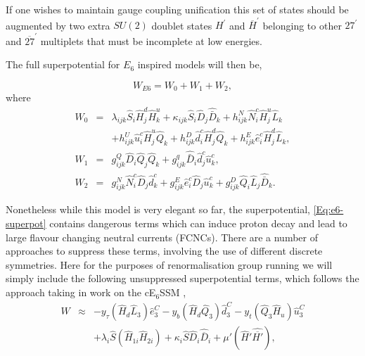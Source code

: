 \documentclass[preprint,amsmath,amssymb,aps,superscriptaddress,prd,showpacs,floatfix]{revtex4-1}
\newcommand{\be}{\begin{equation}}
\newcommand{\ee}{\end{equation}}
\newcommand{\ba}{\begin{eqnarray}}
\newcommand{\ea}{\end{eqnarray}}
\newcommand{\SuperField}[1]{\hat{#1}}
\begin{document}
If one wishes to maintain gauge coupling unification this set of
states should be augmented by two extra $SU(2)$ doublet states
$H^\prime$ and $\overline{H}^\prime$ belonging to other $27^\prime$
and $\overline{27}^\prime$ multiplets that must be incomplete at low
energies.

The full superpotential for $E_6$ inspired models will then be,

\be
W_{E6} = W_0 + W_1 + W_2,
\label{Eq:e6-superpot}
\ee where
\begin{eqnarray}
W_0 &=& \lambda_{ijk} \hat{S}_i \hat{H}^d_{j} \hat{H}^u_{k} + \kappa_{ijk} \hat{S}_i \hat{D}_j \hat{\bar{D}}_k + h^N_{ijk} \hat{N}^c_i \hat{H}^u_{j} \hat{L}_k \nonumber \\
& & + h^U_{ijk} \hat{u}^c_i \hat{H}^u_{j} \hat{Q}_k + h^D_{ijk} \hat{d}^c_i \hat{H}^d_{j} \hat{Q}_k + h^E_{ijk} \hat{e}^c_i \hat{H}^d_{j} \hat{L}_k, \\
W_1 &=& g^Q_{ijk} \hat{D}_i \hat{Q}_j \hat{Q}_k + g^q_{ijk} \hat{\bar{D}}_i \hat{d}^c_j \hat{u}^c_k, \\
W_2 &=& g^N_{ijk} \hat{N}^c_i \hat{D}_j \hat{d}^c_k + g^E_{ijk} \hat{e}^c_i \hat{D}_j \hat{u}^c_k + g^D_{ijk} \hat{Q}_i \hat{L}_j \hat{\bar{D}}_k.
\label{Eq:e6-superpot-parts}
\end{eqnarray}

Nonetheless while this model is very elegant so far, the  superpotential, \ref{Eq:e6-superpot} contains dangerous terms which can induce proton decay and lead to large flavour changing neutral currents (FCNCs).  There are a number of approaches to suppress these terms, involving the use of different discrete symmetries.  Here for the purposes of renormalisation group running we will simply include the following unsuppressed superpotential terms, which follows the approach taking in work on the cE$_6$SSM \cite{Athron:2009ue, Athron:2009bs},
%
    \ba
    W &\approx& - y_{\tau} (\SuperField{H}_d
    \SuperField{L}_3) \SuperField{e}^C_3 - y_b (\SuperField{H}_d
    \SuperField{Q}_3) \SuperField{d}_3^C - y_t (\SuperField{Q}_3
    \SuperField{H}_u) \SuperField{u}_3^C\\
    &&
    + \lambda_i \SuperField{S} (\SuperField{H}_{1i}
    \SuperField{H}_{2i}) + \kappa_i \SuperField{S} \SuperField{D}_i
    \SuperField{\overline{D}}_i + \mu' (\SuperField{H}'
    \SuperField{\overline{H'}}),
    \ea
  \label{SuPot_RGE}
%  
\end{document}
